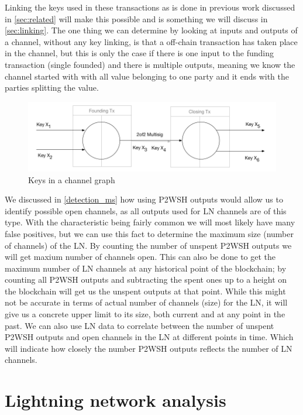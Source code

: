 Linking the keys used in these transactions as is done in previous work discussed in \cref{sec:related} will make this possible and is something we will discuss in \cref{sec:linking}.
The one thing we can determine by looking at inputs and outputs of a channel, without any key linking, is that a off-chain transaction has taken place in the channel, but this is only the case if there is one input to the funding transaction (single founded) and there is multiple outputs, meaning we know the channel started with with all value belonging to one party and it ends with the parties splitting the value.

\begin{figure}[h]
    \centering
    \includegraphics[width=14cm]{figures/keys_subgraph.png}
    \caption{Keys in a channel graph}
    \label{fig:keys_graphs}
\end{figure}

We discussed in \cref{detection_ms} how using P2WSH outputs would allow us to identify possible open channels, as all outputs used for LN channels are of this type. With the characteristic being fairly common we will most likely have many false positives, but we can use this fact to determine the maximum size (number of channels) of the LN.
By counting the number of unspent P2WSH outputs we will get maxium number of channels open. This can also be done to get the maximum number of LN channels at any historical point of the blockchain;
by counting all P2WSH outputs and subtracting the spent ones up to a height on the blockchain will get us the unspent outputs at that point.
While this might not be accurate in terms of actual number of channels (size) for the LN, it will give us a concrete upper limit to its size, both current and at any point in the past.
We can also use LN data to correlate between the number of unspent P2WSH outputs and open channels in the LN at different points in time. Which will indicate how closely the number P2WSH outputs reflects the number of LN channels.

\section{Lightning network analysis}
\label{sec:ln_analysis}

